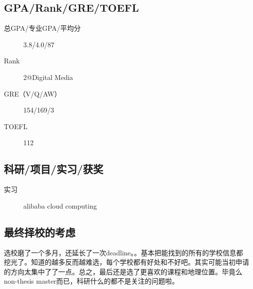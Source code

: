 \documentclass[11pt,fleqn,openany]{book} %
\begin{document}
\subsection*{GPA/Rank/GRE/TOEFL}
\begin{description}
\item[总GPA/专业GPA/平均分] 3.8/4.0/87
\item[Rank] 2@Digital Media
\item[GRE（V/Q/AW）] 154/169/3
\item[TOEFL] 112
\end{description}

\subsection*{科研/项目/实习/获奖}
\begin{description}
\item[实习] alibaba cloud computing
\end{description}
\subsection*{最终择校的考虑}
选校磨了一个多月，还延长了一次deadline。。基本把能找到的所有的学校信息都挖光了。知道的越多反而越难选，每个学校都有好处和不好吧。其实可能当初申请的方向太集中了了一点。总之，最后还是选了更喜欢的课程和地理位置。毕竟么non-thesis master而已，科研什么的都不是关注的问题啦。
\clearpage
\end{document}

